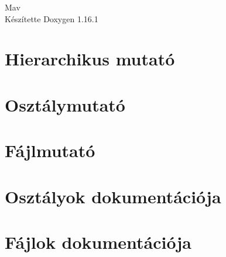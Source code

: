\documentclass[twoside]{book}
\newcommand{\+}{\discretionary{\mbox{\scriptsize$\hookleftarrow$}}{}{}}
\newcommand{\clearemptydoublepage}{%
    \newpage{\pagestyle{empty}\cleardoublepage}%
  }
\begin{document}
  \raggedbottom
    \hypersetup{pageanchor=false,
                bookmarksnumbered=true,
                pdfencoding=unicode
               }
  \begin{titlepage}
  \vspace*{7cm}
  \begin{center}%
  {\Large Mav}\\
  \vspace*{1cm}
  {\large Készítette Doxygen 1.16.1}\\
  \end{center}
  \end{titlepage}
  \clearemptydoublepage
  \tableofcontents
  \clearemptydoublepage
  \hypersetup{pageanchor=true}
\chapter{Hierarchikus mutató}

\chapter{Osztálymutató}

\chapter{Fájlmutató}

\chapter{Osztályok dokumentációja}







\chapter{Fájlok dokumentációja}















  \backmatter
  \newpage
  \clearemptydoublepage
  \printindex
\end{document}
